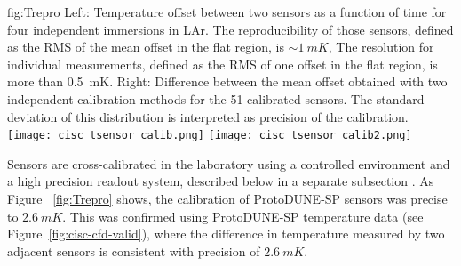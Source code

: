 \begin{dunefigure}{fig:Trepro}{
 Left:   Temperature offset between two sensors as a function of time for four independent immersions in LAr. The reproducibility of those sensors, defined as the RMS of the mean offset in the flat region, is $\sim \SI{1}{mK}$,
    The resolution for individual measurements, defined as the RMS of one offset in the flat region, is more than \SI{0.5}{mK}. Right: Difference between the mean offset obtained with two independent calibration methods for the 51 calibrated sensors. The standard deviation of this distribution is interpreted as precision of the calibration.}
  \texttt{[image: cisc\_tsensor\_calib.png]}%
  \texttt{[image: cisc\_tsensor\_calib2.png]}%
\end{dunefigure}

Sensors are cross-calibrated in the laboratory using a controlled environment and a high precision readout system, described below in a separate subsection  .
As Figure ~\ref{fig:Trepro} shows, the calibration of ProtoDUNE-SP sensors was precise to $\SI{2.6}{mK}$. This was confirmed using ProtoDUNE-SP temperature data (see Figure~\ref{fig:cisc-cfd-valid}), where the difference in temperature measured by two adjacent sensors is consistent with precision of $\SI{2.6}{mK}$.  


